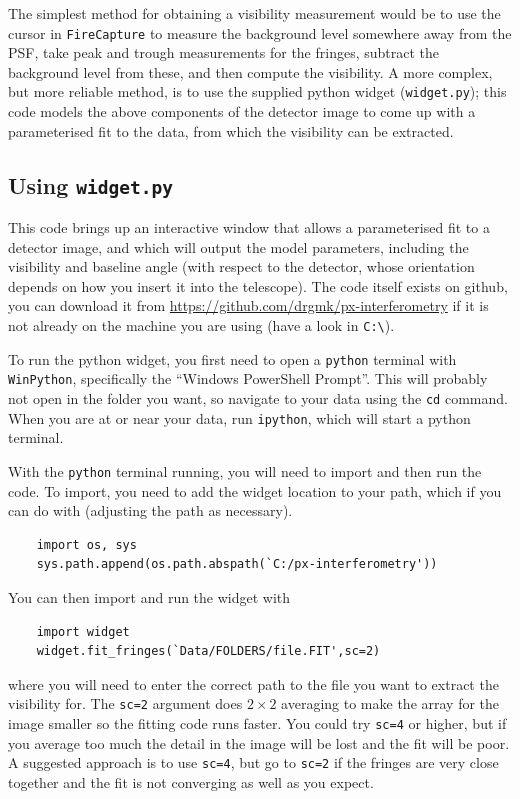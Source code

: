 \documentclass[11pt]{article}
\begin{document}
The simplest method for obtaining a visibility measurement would be to use the cursor in \texttt{FireCapture} to measure the background level somewhere away from the PSF, take peak and trough measurements for the fringes, subtract the background level from these, and then compute the visibility. A more complex, but more reliable method, is to use the supplied python widget (\texttt{widget.py}); this code models the above components of the detector image to come up with a parameterised fit to the data, from which the visibility can be extracted.

\subsection{Using \texttt{widget.py}}\label{sec:widget}

This code brings up an interactive window that allows a parameterised fit to a detector image, and which will output the model parameters, including the visibility and baseline angle (with respect to the detector, whose orientation depends on how you insert it into the telescope). The code itself exists on github, you can download it from
\href{https://github.com/drgmk/px-interferometry}{https://github.com/drgmk/px-interferometry} if it is not already on the machine you are using (have a look in \texttt{C:\textbackslash}).

To run the python widget, you first need to open a \texttt{python} terminal with \texttt{WinPython}, specifically the ``Windows PowerShell Prompt''. This will probably not open in the folder you want, so navigate to your data using the \texttt{cd} command. When you are at or near your data, run \texttt{ipython}, which will start a python terminal.

With the \texttt{python} terminal running, you will need to import and then run the code. To import, you need to add the widget location to your path, which if you can do with (adjusting the path as necessary).
\begin{verbatim}
    import os, sys
    sys.path.append(os.path.abspath(`C:/px-interferometry'))
\end{verbatim}
You can then import and run the widget with
\begin{verbatim}
    import widget
    widget.fit_fringes(`Data/FOLDERS/file.FIT',sc=2)
\end{verbatim}
where you will need to enter the correct path to the file you want to extract the visibility for. The \texttt{sc=2} argument does $2 \times 2$ averaging to make the array for the image smaller so the fitting code runs faster. You could try \texttt{sc=4} or higher, but if you average too much the detail in the image will be lost and the fit will be poor. A suggested approach is to use \texttt{sc=4}, but go to \texttt{sc=2} if the fringes are very close together and the fit is not converging as well as you expect.
\end{document}
